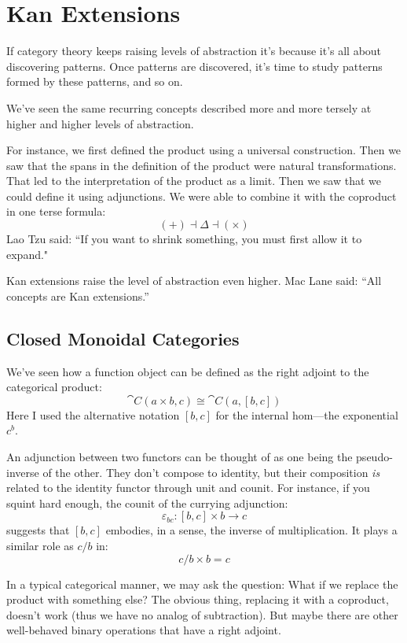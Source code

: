 \documentclass[DaoFP]{subfiles}
\begin{document}
\setcounter{chapter}{18}

\chapter{Kan Extensions}

If category theory keeps raising levels of abstraction it's because it's all about discovering patterns. Once patterns are discovered, it's time to study patterns formed by these patterns, and so on. 

We've seen the same recurring concepts described more and more tersely at higher and higher levels of abstraction. 

For instance, we first defined the product using a universal construction. Then we saw that the spans in the definition of the product were natural transformations. That led to the interpretation of the product as a limit. Then we saw that we could define it using adjunctions. We were able to combine it with the coproduct in one terse formula:
\[ (+) \dashv \Delta \dashv (\times) \]
Lao Tzu said: ``If you want to shrink something, you must first allow it to expand."

Kan extensions raise the level of abstraction even higher. Mac Lane said: ``All concepts are Kan extensions.''

\section{Closed Monoidal Categories}

We've seen how a function object can be defined as the right adjoint to the categorical product:
\[ \cat C (a \times b, c) \cong \cat C (a, [b, c]) \]
Here I used the alternative notation $[b, c]$ for the internal hom---the exponential $c^b$. 

An adjunction between two functors can be thought of as one being the pseudo-inverse of the other. They don't compose to identity, but their composition \emph{is} related to the identity functor through unit and counit. For instance, if you squint hard enough, the counit of the currying adjunction:
\[ \varepsilon_{b c} \colon [b, c] \times b \to c \]
suggests that $[b, c]$ embodies, in a sense, the inverse of multiplication. It plays a similar role as $c/b$ in:
\[ c/b \times b = c \]

In a typical categorical manner, we may ask the question: What if we replace the product with something else? The obvious thing, replacing it with a coproduct, doesn't work (thus we have no analog of subtraction). But maybe there are other well-behaved binary operations that have a right adjoint.
\end{document}
